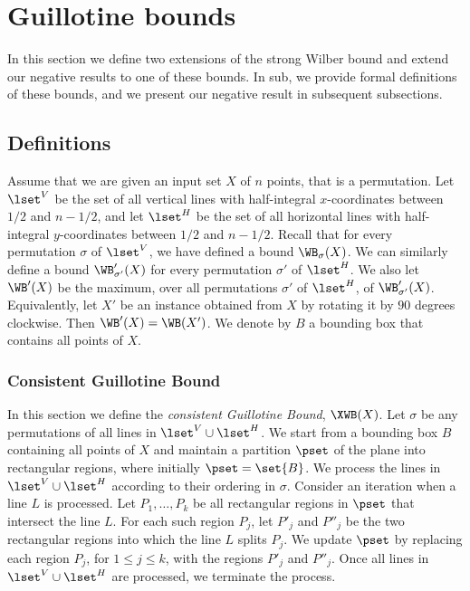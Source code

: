 %

%

%

%
%
%
%
\section{Guillotine bounds}\label{sec: extension to extended}
%
%
%
%

In this section we define two extensions of the strong Wilber bound and extend our negative results to  one of these bounds.
%
In sub, we provide formal definitions of these bounds, and we present our negative result in subsequent subsections.  
 
\subsection{Definitions} 
\label{subsec: defs} 


Assume that we are given an input set $X$ of $n$ points, that is a permutation. Let $\lset^V$ be the set of all vertical lines with half-integral $x$-coordinates between $1/2$ and $n-1/2$, and let $\lset^H$ be the set of all horizontal lines with half-integral $y$-coordinates between $1/2$ and $n-1/2$. Recall that for every permutation $\sigma$ of $\lset^V$, we have defined a bound $\WB_{\sigma}(X)$. We can similarly define a bound $\WB'_{\sigma'}(X)$ for every permutation $\sigma'$ of $\lset^H$. We also let $\WB'(X)$ be the maximum, over all permutations $\sigma'$ of $\lset^H$, of $\WB'_{\sigma'}(X)$. Equivalently, let $X'$ be an instance obtained from $X$ by rotating it by $90$ degrees clockwise. Then $\WB'(X)=\WB(X')$. We denote by $B$ a bounding box that contains all points of $X$.

\subsubsection{Consistent Guillotine Bound}


In this section we define the \emph{consistent Guillotine Bound}, $\XWB(X)$. Let $\sigma$ be any permutations of all lines in $\lset^V\cup \lset^H$. 
We start from a bounding box $B$ containing all points of $X$ and maintain a partition $\pset$ of the plane into rectangular regions, where initially $\pset = \set{B}$.  
We process the lines in $\lset^V \cup \lset^H$ according to their ordering in $\sigma$. 
Consider an iteration when a line $L$ is processed. Let $P_1,\ldots, P_k$ be all rectangular regions in $\pset$ that intersect the line $L$. For each such region $P_j$, let $P'_j$ and $P''_j$ be the two rectangular regions into which the line $L$ splits $P_j$. 
We update $\pset$ by replacing each region $P_j$, for $1\leq j\leq k$, with the regions $P'_j$ and $P''_j$. 
Once all lines in $\lset^V\cup \lset^H$ are processed, we terminate the process.


